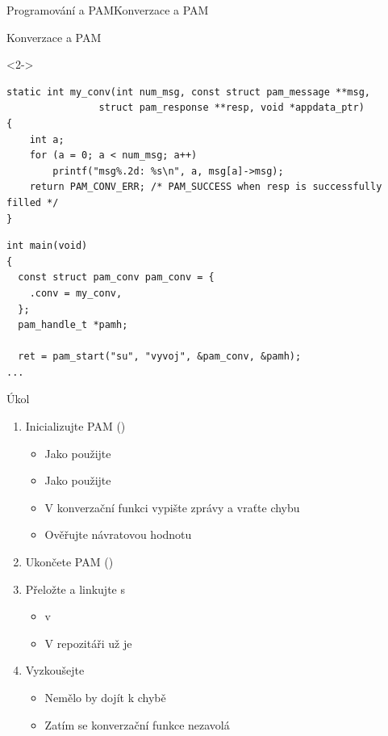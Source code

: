 \begin{frame}[fragile]{Programování a PAM}{Konverzace a PAM}

  \begin{block}{Konverzace a PAM}
  \begin{uncoverenv}<2->
  \begin{lstlisting}
static int my_conv(int num_msg, const struct pam_message **msg,
                struct pam_response **resp, void *appdata_ptr)
{
    int a;
    for (a = 0; a < num_msg; a++)
        printf("msg%.2d: %s\n", a, msg[a]->msg);
    return PAM_CONV_ERR; /* PAM_SUCCESS when resp is successfully filled */
}
  \end{lstlisting}
  \end{uncoverenv}
  \begin{lstlisting}
int main(void)
{
  const struct pam_conv pam_conv = {
    .conv = my_conv,
  };
  pam_handle_t *pamh;

  ret = pam_start("su", "vyvoj", &pam_conv, &pamh);
...
  \end{lstlisting}
  \end{block}

\end{frame}

\begin{frame}{Úkol}

  \begin{enumerate}
    \item Inicializujte PAM ()
    \begin{itemize}
      \item Jako  použijte 
      \item Jako  použijte 
      \item V konverzační funkci vypište zprávy a vraťte chybu
      \item Ověřujte návratovou hodnotu
    \end{itemize}

    \item Ukončete PAM ()
    \item Přeložte a linkujte s 
    \begin{itemize}
      \item {} v 
      \item V repozitáři už je
    \end{itemize}

    \item Vyzkoušejte
    \begin{itemize}
      \item Nemělo by dojít k chybě
      \item Zatím se konverzační funkce nezavolá
    \end{itemize}
  \end{enumerate}

\end{frame}

